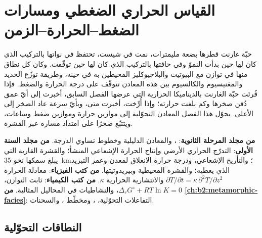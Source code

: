 \chapter{القياس الحراري الضغطي ومسارات الضغط--الحرارة--الزمن}\label{ch:b2:pt-paths}

حبّة غارنت قطرها بضعة مليمترات، نمت في شيست، تحتفظ في نواتها بالتركيب
الذي كان لها حين بدأت النموّ وفي حافتها بالتركيب الذي كان لها حين توقّفت. وكان كل
نطاق منها في توازن مع البيوتيت والبلاجيوكليز المحيطين به في حينه،
وطريقة توزّع الحديد والمغنيسيوم والكالسيوم بين هذه المعادن تتوقّف على درجة الحرارة
والضغط. فإذا قُرئت حبّة الغارنت بالديناميكا الحرارية التي عرضها الفصل السابق، أخبرت إلى أيّ
عمق دُفن صخرها وكم بلغت حرارته؛ وإذا أُرِّخت، أخبرت متى، وبأيّ سرعة
عاد الصخر إلى الأعلى. يحوّل هذا الفصل المعادن التحوّلية إلى موازين حرارة وموازين ضغط
وساعات، ويتتبّع صخرًا على امتداد مساره عبر القشرة.

\begin{recall}
\textbf{من مجلد المرحلة الثانوية}: ، والمعادن الدليلية وخطوط تساوي الدرجة.
\textbf{من مجلد السنة الأولى}: التدرّج الحراري الأرضي وإنتاج الحرارة الإشعاعي المنشأ؛
والقشرة القارية التي يبلغ سمكها نحو \qty{35}{km}؛ والتأريخ الإشعاعي، ودرجة حرارة الانغلاق
لمعدن وعمر التبريد الذي يعطيه؛ والقشرة المحيطية وبيريدوتيتها.
\textbf{من كتب الفيزياء}: معادلة الحرارة $\partial T/\partial t = \kappa\,
\partial^2 T/\partial z^2$ والانتشارية الحرارية $\kappa$. \textbf{من كتب
الكيمياء}: ثابت التوازن، $\Delta_r G^\circ + RT\ln K = 0$، والنشاطيات في
المحاليل المثالية. \textbf{من \cref{ch:b2:metamorphic-facies}}: التفاعلات التحوّلية،
، ومخطّط ، والسحنات.
\end{recall}

\section{النطاقات التحوّلية}\label{sec:b2:pt-paths:zones}

